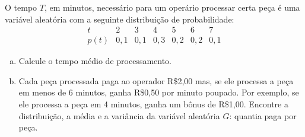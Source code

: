 %
%


\begin{exercicioBanco}[\valorquestao]
    O tempo \(T\), em minutos, necessário para um operário processar certa peça é uma variável aleatória com a seguinte distribuição de probabilidade:
    \[
        \begin{array}{c|c|c|c|c|c|c}
            t & 2 & 3 & 4 & 5 & 6 & 7 \\
            \hline
            p(t) & 0,1 & 0,1 & 0,3 & 0,2 & 0,2 & 0,1
        \end{array}
    \]
    \begin{enumerate}[(a)]
        \item Calcule o tempo médio de processamento.
        \item Cada peça processada paga ao operador R\$2,00 mas, se ele processa a peça em menos de 6 minutos, ganha R\$0,50 por minuto poupado. Por exemplo, se ele processa a peça em 4 minutos, ganha um bônus de R\$1,00. Encontre a distribuição, a média e a variância da variável aleatória \(G\): quantia paga por peça.
    \end{enumerate}
\end{exercicioBanco}

